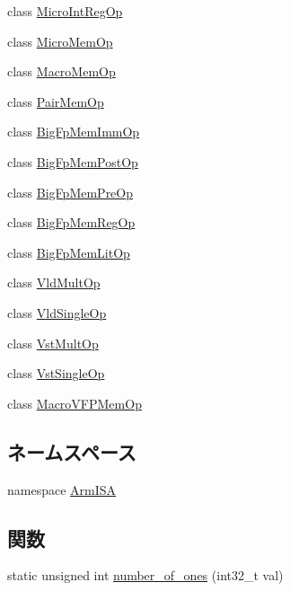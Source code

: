 \begin{DoxyCompactItemize}
\item 
class \hyperlink{classArmISA_1_1MicroIntRegOp}{MicroIntRegOp}
\item 
class \hyperlink{classArmISA_1_1MicroMemOp}{MicroMemOp}
\item 
class \hyperlink{classArmISA_1_1MacroMemOp}{MacroMemOp}
\item 
class \hyperlink{classArmISA_1_1PairMemOp}{PairMemOp}
\item 
class \hyperlink{classArmISA_1_1BigFpMemImmOp}{BigFpMemImmOp}
\item 
class \hyperlink{classArmISA_1_1BigFpMemPostOp}{BigFpMemPostOp}
\item 
class \hyperlink{classArmISA_1_1BigFpMemPreOp}{BigFpMemPreOp}
\item 
class \hyperlink{classArmISA_1_1BigFpMemRegOp}{BigFpMemRegOp}
\item 
class \hyperlink{classArmISA_1_1BigFpMemLitOp}{BigFpMemLitOp}
\item 
class \hyperlink{classArmISA_1_1VldMultOp}{VldMultOp}
\item 
class \hyperlink{classArmISA_1_1VldSingleOp}{VldSingleOp}
\item 
class \hyperlink{classArmISA_1_1VstMultOp}{VstMultOp}
\item 
class \hyperlink{classArmISA_1_1VstSingleOp}{VstSingleOp}
\item 
class \hyperlink{classArmISA_1_1MacroVFPMemOp}{MacroVFPMemOp}
\end{DoxyCompactItemize}
\subsection*{ネームスペース}
\begin{DoxyCompactItemize}
\item 
namespace \hyperlink{namespaceArmISA}{ArmISA}
\end{DoxyCompactItemize}
\subsection*{関数}
\begin{DoxyCompactItemize}
\item 
static unsigned int \hyperlink{namespaceArmISA_a294787b82a4a15394e65702f8e8cde80}{number\_\-of\_\-ones} (int32\_\-t val)
\end{DoxyCompactItemize}
